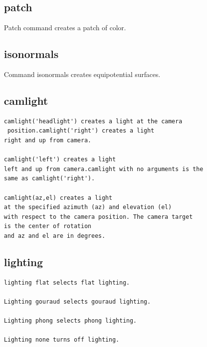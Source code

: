 \documentclass{ximera}
\begin{document}
\subsection{patch}

Patch command creates a patch of color.


\subsection{isonormals}

Command isonormals creates equipotential surfaces. 
\subsection{camlight}

\begin{verbatim}
camlight('headlight') creates a light at the camera
 position.camlight('right') creates a light
right and up from camera.

camlight('left') creates a light
left and up from camera.camlight with no arguments is the
same as camlight('right').

camlight(az,el) creates a light
at the specified azimuth (az) and elevation (el)
with respect to the camera position. The camera target 
is the center of rotation
and az and el are in degrees.

\end{verbatim}



\subsection{lighting}


\begin{verbatim}
lighting flat selects flat lighting.

Lighting gouraud selects gouraud lighting.

Lighting phong selects phong lighting.

Lighting none turns off lighting.
\end{verbatim}
\end{document}
